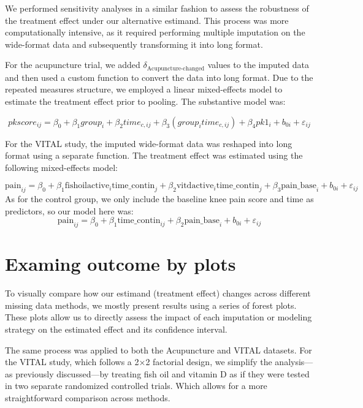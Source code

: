 \documentclass{article}
\begin{document}
We performed sensitivity analyses in a similar fashion to assess the
robustness of the treatment effect under our alternative estimand. This
process was more computationally intensive, as it required performing
multiple imputation on the wide-format data and subsequently
transforming it into long format.

For the acupuncture trial, we added
\(\delta_\mathrm{Acupuncture\text{-}changed}\) values to the imputed
data and then used a custom function to convert the data into long
format. Due to the repeated measures structure, we employed a linear
mixed-effects model to estimate the treatment effect prior to pooling.
The substantive model was:

\[pkscore_{ij} = \beta_0 + \beta_1 group_i + \beta_2 time_{c,ij} + \beta_3 (group_i time_{c,ij}) + \beta_4 pk1_i + b_{0i} + \varepsilon_{ij}\]

For the VITAL study, the imputed wide-format data was reshaped into long
format using a separate function. The treatment effect was estimated
using the following mixed-effects model:

\[\text{pain}_{ij} = \beta_0 
+ \beta_1 \text{fishoilactive}_{i} \text{time\_contin}_{j}
+ \beta_2 \text{vitdactive}_{i} \text{time\_contin}_{j}
+ \beta_3 \text{pain\_base}_{i}
+ b_{0i} + \varepsilon_{ij}\] As for the control group, we only include
the baseline knee pain score and time as predictors, so our model here
was:
\[\text{pain}_{ij} = \beta_0 + \beta_1 \text{time\_contin}_{ij} + \beta_2 \text{pain\_base}_i + b_{0i} + \varepsilon_{ij}\]

\section{Examing outcome by plots}\label{examing-outcome-by-plots}

To visually compare how our estimand (treatment effect) changes across
different missing data methods, we mostly present results using a series
of forest plots. These plots allow us to directly assess the impact of
each imputation or modeling strategy on the estimated effect and its
confidence interval.

The same process was applied to both the Acupuncture and VITAL datasets.
For the VITAL study, which follows a 2×2 factorial design, we simplify
the analysis---as previously discussed---by treating fish oil and
vitamin D as if they were tested in two separate randomized controlled
trials. Which allows for a more straightforward comparison across
methods.
\end{document}

